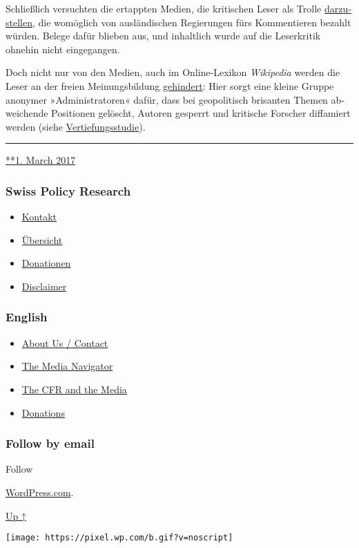 Schließlich versuchten die ertappten Medien, die kri­ti­schen Leser als
Trolle
\href{https://www.nzz.ch/international/putins-internetpiraten-1.18324628}{dar­zu­stellen},
die womöglich von aus­län­dischen Re­gie­rungen fürs Kom­men­tieren
bezahlt würden. Be­lege da­für blie­ben aus, und inhaltlich wurde auf
die Leser­kritik ohnehin nicht ein­ge­gangen.

Doch nicht nur von den Medien, auch im Online-Lexikon \emph{Wikipedia}
werden die Leser an der freien Meinungs­bil­dung
\href{https://swprs.org/propaganda-in-der-wikipedia/}{gehindert}: Hier
sorgt eine kleine Gruppe anonymer »Adminis­tra­toren« dafür, dass bei
geo­po­li­tisch brisanten Themen ab­wei­chende Positionen gelöscht,
Autoren gesperrt und kritische Forscher diffamiert werden (siehe
\href{https://swprs.org/propaganda-in-der-wikipedia/}{Vertiefungsstudie}).

\begin{center}\rule{0.5\linewidth}{\linethickness}\end{center}

\href{https://swprs.org/2017/03/01/leserkommentare/}{**1. March 2017}

\hypertarget{swiss-policy-research}{%
\subsubsection{Swiss Policy Research}\label{swiss-policy-research}}

\begin{itemize}
\tightlist
\item
  \href{https://swprs.org/kontakt/}{Kontakt}
\item
  \href{https://swprs.org/uebersicht/}{Übersicht}
\item
  \href{https://swprs.org/donationen/}{Donationen}
\item
  \href{https://swprs.org/disclaimer/}{Disclaimer}
\end{itemize}

\hypertarget{english}{%
\subsubsection{English}\label{english}}

\begin{itemize}
\tightlist
\item
  \href{https://swprs.org/contact/}{About Us / Contact}
\item
  \href{https://swprs.org/media-navigator/}{The Media Navigator}
\item
  \href{https://swprs.org/the-american-empire-and-its-media/}{The CFR
  and the Media}
\item
  \href{https://swprs.org/donations/}{Donations}
\end{itemize}

\hypertarget{follow-by-email}{%
\subsubsection{Follow by email}\label{follow-by-email}}

Follow

\href{https://wordpress.com/?ref=footer_custom_com}{WordPress.com}.

\protect\hyperlink{}{Up ↑}

\texttt{[image: https://pixel.wp.com/b.gif?v=noscript]}
